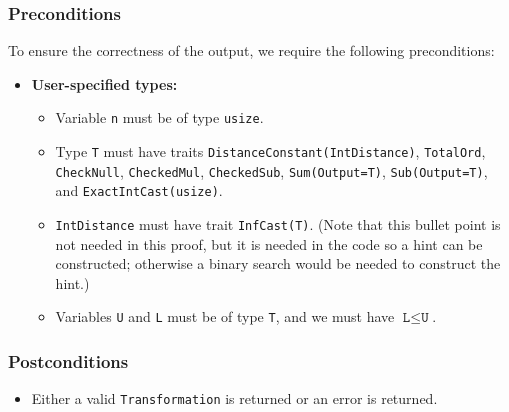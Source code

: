 \documentclass[11pt,a4paper]{article}
\theoremstyle{definition}
\begin{document}
\subsubsection*{Preconditions}
To ensure the correctness of the output, we require the following preconditions:

\begin{itemize}
    \item \textbf{User-specified types:}
    \begin{itemize}
        \item Variable \texttt{n} must be of type \texttt{usize}.
        \item Type \texttt{T} must have traits \texttt{DistanceConstant(IntDistance)}, \texttt{TotalOrd}, \texttt{CheckNull}, \texttt{CheckedMul}, \texttt{CheckedSub}, \texttt{Sum(Output=T)}, \texttt{Sub(Output=T)},  and \texttt{ExactIntCast(usize)}.
        \item \texttt{IntDistance} must have trait \texttt{InfCast(T)}. (Note that this bullet point is not needed in this proof, but it is needed in the code so a hint can be constructed; otherwise a binary search would be needed to construct the hint.)
        \item Variables \texttt{U} and \texttt{L} must be of type \texttt{T}, and we must have $\texttt{L} \leq \texttt{U}$.

\end{itemize}
\end{itemize}

\subsubsection*{Postconditions}
\begin{itemize}
    \item Either a valid \texttt{Transformation} is returned or an error is returned.
\end{itemize}
\end{document}

